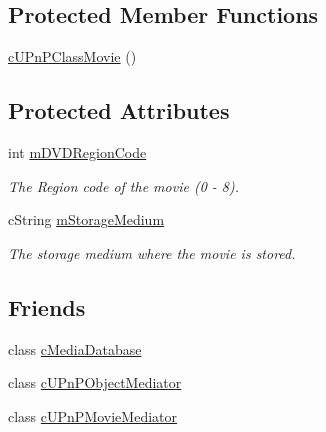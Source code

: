 \subsection*{Protected Member Functions}
\begin{CompactItemize}
\item 
\hyperlink{classcUPnPClassMovie_7343932df4e5bfd9821e16026cb7c66d}{cUPnPClassMovie} ()
\end{CompactItemize}
\subsection*{Protected Attributes}
\begin{CompactItemize}
\item 
\hypertarget{classcUPnPClassMovie_90cc86f3eb248bbea4b3bf845862455f}{
int \hyperlink{classcUPnPClassMovie_90cc86f3eb248bbea4b3bf845862455f}{mDVDRegionCode}}
\label{classcUPnPClassMovie_90cc86f3eb248bbea4b3bf845862455f}

\begin{CompactList}\small\item\em The Region code of the movie (0 - 8). \item\end{CompactList}\item 
\hypertarget{classcUPnPClassMovie_a9bcda545b8ce19e3b613757b3759127}{
cString \hyperlink{classcUPnPClassMovie_a9bcda545b8ce19e3b613757b3759127}{mStorageMedium}}
\label{classcUPnPClassMovie_a9bcda545b8ce19e3b613757b3759127}

\begin{CompactList}\small\item\em The storage medium where the movie is stored. \item\end{CompactList}\end{CompactItemize}
\subsection*{Friends}
\begin{CompactItemize}
\item 
\hypertarget{classcUPnPClassMovie_3d0d0aedce8b1c661ea360b9a6d616f6}{
class \hyperlink{classcUPnPClassMovie_3d0d0aedce8b1c661ea360b9a6d616f6}{cMediaDatabase}}
\label{classcUPnPClassMovie_3d0d0aedce8b1c661ea360b9a6d616f6}

\item 
\hypertarget{classcUPnPClassMovie_aefab39434a832c545ac75a79fa81d23}{
class \hyperlink{classcUPnPClassMovie_aefab39434a832c545ac75a79fa81d23}{cUPnPObjectMediator}}
\label{classcUPnPClassMovie_aefab39434a832c545ac75a79fa81d23}

\item 
\hypertarget{classcUPnPClassMovie_d1fb2eb621f67f9aa7abf2e67e1a5305}{
class \hyperlink{classcUPnPClassMovie_d1fb2eb621f67f9aa7abf2e67e1a5305}{cUPnPMovieMediator}}
\label{classcUPnPClassMovie_d1fb2eb621f67f9aa7abf2e67e1a5305}

\end{CompactItemize}


